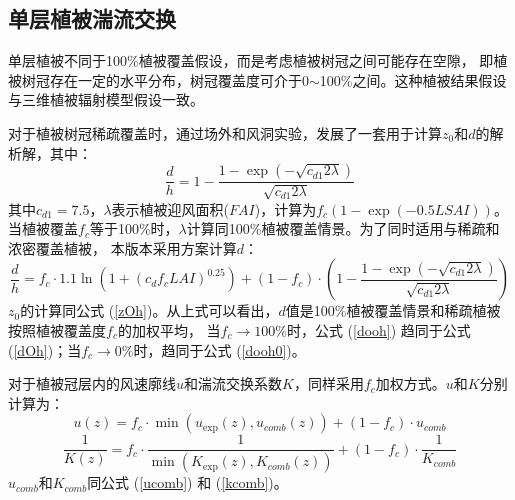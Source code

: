 \subsection{单层植被湍流交换}
单层植被不同于100\%植被覆盖假设，而是考虑植被树冠之间可能存在空隙，
即植被树冠存在一定的水平分布，树冠覆盖度可介于0$\sim$100\%之间。这种植被结果假设与三维植被辐射模型假设一致。


对于植被树冠稀疏覆盖时，\citet{raupach1992drag,raupach1994simplified}通过场外和风洞实验，发展了一套用于计算$z_0$和$d$的解析解，其中：
\begin{equation}\label{dooh0}
\frac{d}{h}=1-\frac{1-\exp \left(-\sqrt{c_{d1} 2 \lambda}\right)}{\sqrt{c_{d1} 2 \lambda}}
\end{equation}
其中$c_{d1}=7.5$，$\lambda$表示植被迎风面积($FAI$)，计算为$f_c\left(1-\exp{\left(-0.5LSAI\right)}\right)$。
当植被覆盖$f_c$等于100\%时，$\lambda$计算同100\%植被覆盖情景。为了同时适用与稀疏和浓密覆盖植被，
本版本采用\citet{dai2019different}方案计算$d$：
\begin{equation}\label{dooh}
\frac{d}{h}=f_{c} \cdot 1.1 \ln \left(1+\left(c_{d} f_{c} LAI\right)^{0.25}\right)+\left(1-f_{c}\right) \cdot\left(1-\frac{1-\exp \left(-\sqrt{c_{d1} 2 \lambda}\right)}{\sqrt{c_{d1} 2 \lambda}}\right)
\end{equation}
$z_0$的计算同公式 (\ref{zOh})。从上式可以看出，$d$值是100\%植被覆盖情景和稀疏植被按照植被覆盖度$f_c$的加权平均，
当$f_c\rightarrow100\%$时，公式 (\ref{dooh}) 趋同于公式 (\ref{dOh})；当$f_c\rightarrow0\%$时，趋同于公式 (\ref{dooh0})。


对于植被冠层内的风速廓线$u$和湍流交换系数$K$，同样采用$f_c$加权方式。$u$和$K$分别计算为：
\begin{equation}
u(z)=f_{c} \cdot \min \left(u_{\exp }(z), u_{comb}(z)\right)+\left(1-f_{c}\right) \cdot u_{comb}
\end{equation}
\begin{equation}
\frac{1}{K(z)}=f_{c} \cdot \frac{1}{\min \left(K_{\exp}(z), K_{comb}(z)\right)}+\left(1-f_{c}\right) \cdot \frac{1}{K_{comb}}
\end{equation}
$u_{comb}$和$K_{comb}$同公式 (\ref{ucomb}) 和 (\ref{kcomb})。


